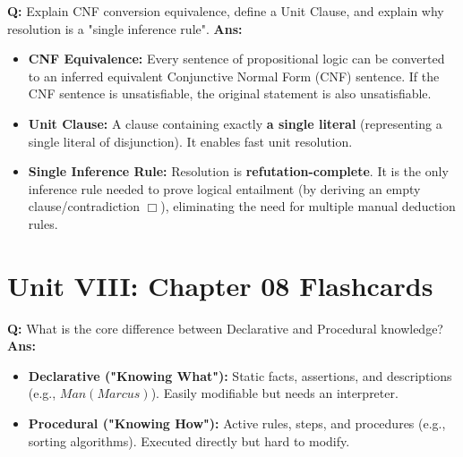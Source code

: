 \documentclass[10pt,a4paper,twocolumn]{article}
\begin{document}
\begin{tcolorbox}[
  colback=white,
  colframe=UnitColorSeven,
  colbacktitle=gray!10!white,
  coltitle=black,
  fonttitle=\bfseries\sffamily\small,
  title={Unit VII $\bullet$ Card 10: CNF Equivalence, Unit Clause, and Resolution (Q7.4)},
  boxrule=1.2pt,
  arc=2mm,
  outer arc=2mm,
  boxsep=1.5mm,
  top=1mm,
  bottom=1mm,
  left=1.5mm,
  right=1.5mm,
  before skip=2.5mm,
  after skip=2.5mm
]
\textbf{Q:} Explain CNF conversion equivalence, define a Unit Clause, and explain why resolution is a "single inference rule".
\tcbline
\textbf{Ans:} \begin{itemize}
  \item   \textbf{CNF Equivalence:} Every sentence of propositional logic can be converted to an inferred equivalent Conjunctive Normal Form (CNF) sentence. If the CNF sentence is unsatisfiable, the original statement is also unsatisfiable.
  \item   \textbf{Unit Clause:} A clause containing exactly \textbf{a single literal} (representing a single literal of disjunction). It enables fast unit resolution.
  \item   \textbf{Single Inference Rule:} Resolution is \textbf{refutation-complete}. It is the only inference rule needed to prove logical entailment (by deriving an empty clause/contradiction $\Box$), eliminating the need for multiple manual deduction rules.
\end{itemize}
\end{tcolorbox}

\section*{Unit VIII: Chapter 08 Flashcards}

\begin{tcolorbox}[
  colback=white,
  colframe=UnitColorEight,
  colbacktitle=gray!10!white,
  coltitle=black,
  fonttitle=\bfseries\sffamily\small,
  title={Unit VIII $\bullet$ Card 1: Declarative vs. Procedural Knowledge},
  boxrule=1.2pt,
  arc=2mm,
  outer arc=2mm,
  boxsep=1.5mm,
  top=1mm,
  bottom=1mm,
  left=1.5mm,
  right=1.5mm,
  before skip=2.5mm,
  after skip=2.5mm
]
\textbf{Q:} What is the core difference between Declarative and Procedural knowledge?
\tcbline
\textbf{Ans:} \begin{itemize}
  \item   \textbf{Declarative ("Knowing What"):} Static facts, assertions, and descriptions (e.g., $Man(Marcus)$). Easily modifiable but needs an interpreter.
  \item   \textbf{Procedural ("Knowing How"):} Active rules, steps, and procedures (e.g., sorting algorithms). Executed directly but hard to modify.
\end{itemize}
\end{tcolorbox}
\end{document}
